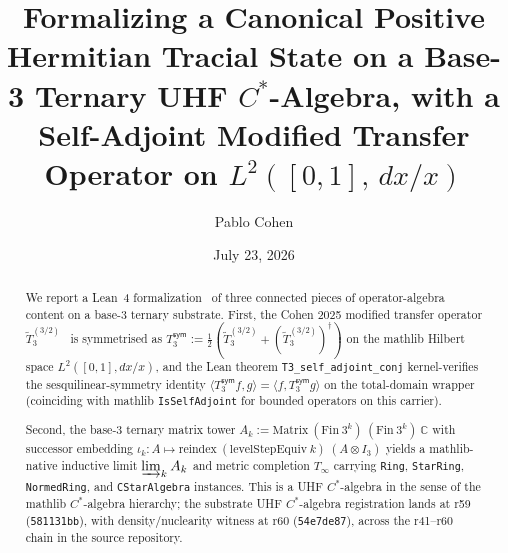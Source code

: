 \documentclass[11pt,a4paper]{amsart}
\title[Formalizing a UHF Tracial State on a Base-3 Ternary $C^*$-Algebra]{Formalizing a Canonical Positive Hermitian Tracial State on a Base-3 Ternary UHF $C^*$-Algebra, with a Self-Adjoint Modified Transfer Operator on $L^2([0,1],\, dx/x)$}
\author{Pablo Cohen}
\date{July 23, 2026}
\theoremstyle{plain}
\theoremstyle{definition}
\begin{document}
\maketitle

\begin{abstract}
\noindent We report a Lean~4 formalization~\cite{moura-ullrich2021,mathlib2020} of three connected pieces of operator-algebra content on a base-3 ternary substrate. First, the Cohen 2025 modified transfer operator $\widetilde{T}_3^{(3/2)}$~\cite{cohen2025transferOp} is symmetrised as $T_3^{\textsf{sym}} := \tfrac{1}{2}(\widetilde{T}_3^{(3/2)} + (\widetilde{T}_3^{(3/2)})^\dagger)$ on the mathlib Hilbert space $L^2([0,1], dx/x)$, and the Lean theorem \texttt{T3\_self\_adjoint\_conj} kernel-verifies the sesquilinear-symmetry identity $\langle T_3^{\textsf{sym}} f, g \rangle = \langle f, T_3^{\textsf{sym}} g \rangle$ on the total-domain wrapper (coinciding with mathlib \texttt{IsSelfAdjoint} for bounded operators on this carrier).

\smallskip

\noindent Second, the base-3 ternary matrix tower $A_k := \mathrm{Matrix}~(\mathrm{Fin}~3^k)~(\mathrm{Fin}~3^k)~\mathbb{C}$ with successor embedding $\iota_k \colon A \mapsto \mathrm{reindex}~(\mathrm{levelStepEquiv}~k)~(A \otimes I_3)$ yields a mathlib-native inductive limit $\varinjlim_k A_k$ and metric completion $T_\infty$ carrying \texttt{Ring}, \texttt{StarRing}, \texttt{NormedRing}, and \texttt{CStarAlgebra} instances. This is a UHF $C^*$-algebra in the sense of the mathlib $C^*$-algebra hierarchy; the substrate UHF $C^*$-algebra registration lands at r59 (\texttt{581131bb}), with density/nuclearity witness at r60 (\texttt{54e7de87}), across the r41--r60 chain in the source repository.

\smallskip


\end{abstract}
\end{document}
